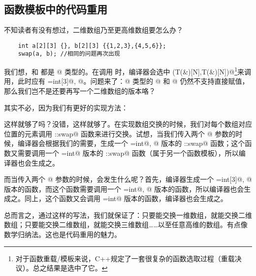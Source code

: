 \subsection*{函数模板中的代码重用}
不知读者有没有想过，二维数组乃至更高维数组要怎么办？
\begin{lstlisting}
    int a[2][3] {}, b[2][3] {{1,2,3},{4,5,6}};
    swap(a, b); //相同的问题再次出现
\end{lstlisting}\par
我们想，\lstinline@a@ 和 \lstinline@b@ 都是 \lstinline@int[2][3]@ 类型的。在调用 \lstinline@swap@ 时，编译器会选中 \lstinline@swap(T(&)[N],T(&)[N])@\footnote{对于函数重载/模板来说，C++规定了一套很复杂的函数选取过程（重载决议）。总之结果是选中了它。}来调用，此时应有 \lstinline@T=int[3]@, @。问题来了：\lstinline@int[3]@ 类型的 \lstinline@a[i]@ 和 \lstinline@b[i]@ 仍然不支持直接赋值，那么我们岂不是还要再写一个二维数组的版本咯？\par
其实不必，因为我们有更好的实现方法：

这样就够了吗？没错，这样就够了。在实现数组交换的时候，我们对每个数组对应位置的元素调用 \lstinline@user::swap@ 函数来进行交换。试想，当我们传入两个 \lstinline@int[3]@ 参数的时候，编译器会根据我们的需要，生成一个 \lstinline@T=int@, @ 版本的 \lstinline@user::swap@ 函数；这个函数又需要调用一个 \lstinline@T=int@ 版本的 \lstinline@user::swap@ 函数（属于另一个函数模板），所以编译器也会生成之。\par
而当传入两个 \lstinline@int[2][3]@ 参数的时候，会发生什么呢？首先，编译器生成一个 \lstinline@T=int[3]@, @ 版本的函数，而这个函数需要调用一个 \lstinline@T=int@, @ 版本的函数，所以编译器也会生成之。同上，这个函数又会调用 \lstinline@T=int@ 版本的函数，编译器也会生成之。\par
总而言之，通过这样的写法，我们就保证了：只要能交换一维数组，就能交换二维数组；只要能交换二维数组，就能交换三维数组……以至任意高维的数组。有点像数学归纳法。这也是代码重用的魅力。\par
